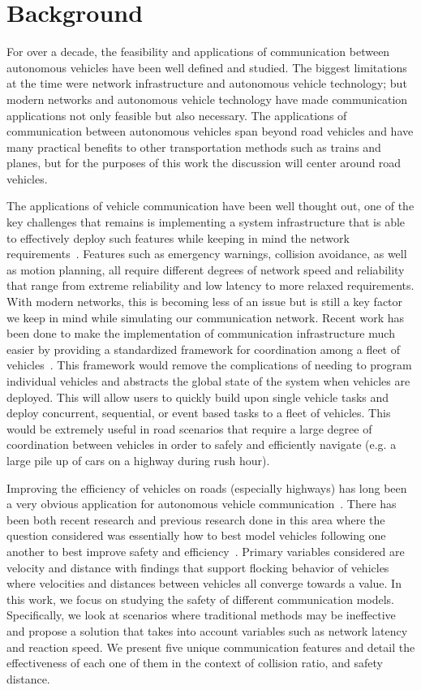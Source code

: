 \section{Background}

For over a decade, the feasibility and applications of communication between autonomous
vehicles have been well defined and studied. The biggest limitations at the time were
network infrastructure and autonomous vehicle technology; but modern networks and
autonomous vehicle technology have made communication applications not only feasible
but also necessary. The applications of communication between autonomous vehicles
span beyond road vehicles and have many practical benefits to other transportation methods
such as trains and planes, but for the purposes of this work the discussion will center
around road vehicles.

The applications of vehicle communication have been well thought out, one of the key
challenges that remains is implementing a system infrastructure that is able to
effectively deploy such features while keeping in mind the network requirements~\cite{willke2009survey}.
Features such as emergency warnings, collision avoidance, as well as motion planning,
all require different degrees of network speed and reliability that range from
extreme reliability and low latency to more relaxed requirements. With modern networks,
this is becoming less of an issue but is still a key factor we keep in mind while
simulating our communication network.
Recent work has been done to make
the implementation of communication infrastructure much easier by providing a standardized
framework for coordination among a fleet of vehicles~\cite{keila2018}.
This framework would remove
the complications of needing to program individual vehicles and abstracts the global
state of the system when vehicles are deployed. This will allow users to quickly build
upon single vehicle tasks and deploy concurrent, sequential, or event based tasks
to a fleet of vehicles. This would be extremely useful in road scenarios that require
a large degree of coordination between vehicles in order to safely and efficiently
navigate (e.g. a large pile up of cars on a highway during rush hour).

Improving the efficiency of vehicles on roads (especially highways) has long been a
very obvious application for autonomous vehicle communication~\cite{murray2007recent}.
There has been both recent research and previous research done in this area where the question
considered was essentially how to best model vehicles following one another to best
improve safety and efficiency~\cite{ou2017extended, tanner2003coordination}.
Primary variables considered are velocity
and distance with findings that support flocking behavior of vehicles where velocities
and distances between vehicles all converge towards a value.
In this work, we focus on studying the safety of different communication models.
Specifically, we look at scenarios where traditional methods may be ineffective and propose
a solution that takes into account variables such as network latency and reaction speed.
We present five unique communication features and detail the effectiveness of each one of them
in the context of collision ratio, and safety distance.
